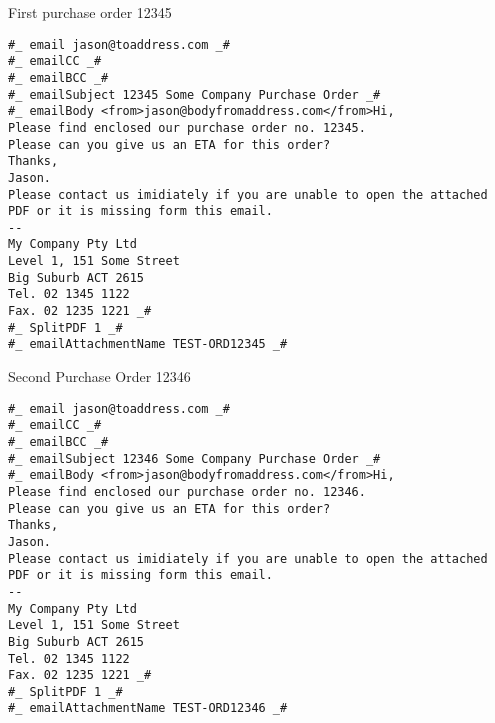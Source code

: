 \documentclass{article}
\begin{document}
\thispagestyle{empty}
First purchase order 12345
\newpage
\thispagestyle{empty}
\begin{verbatim}
#_ email jason@toaddress.com _#
#_ emailCC _#
#_ emailBCC _#
#_ emailSubject 12345 Some Company Purchase Order _#
#_ emailBody <from>jason@bodyfromaddress.com</from>Hi,
Please find enclosed our purchase order no. 12345.
Please can you give us an ETA for this order?
Thanks,
Jason.
Please contact us imidiately if you are unable to open the attached
PDF or it is missing form this email.
--
My Company Pty Ltd
Level 1, 151 Some Street
Big Suburb ACT 2615
Tel. 02 1345 1122
Fax. 02 1235 1221 _#
#_ SplitPDF 1 _#
#_ emailAttachmentName TEST-ORD12345 _#
\end{verbatim}
\newpage
\thispagestyle{empty}
Second Purchase Order 12346
\newpage
\thispagestyle{empty}
\begin{verbatim}
#_ email jason@toaddress.com _#
#_ emailCC _#
#_ emailBCC _#
#_ emailSubject 12346 Some Company Purchase Order _#
#_ emailBody <from>jason@bodyfromaddress.com</from>Hi,
Please find enclosed our purchase order no. 12346.
Please can you give us an ETA for this order?
Thanks,
Jason.
Please contact us imidiately if you are unable to open the attached
PDF or it is missing form this email.
--
My Company Pty Ltd
Level 1, 151 Some Street
Big Suburb ACT 2615
Tel. 02 1345 1122
Fax. 02 1235 1221 _#
#_ SplitPDF 1 _#
#_ emailAttachmentName TEST-ORD12346 _#
\end{verbatim}
\newpage
\end{document}
